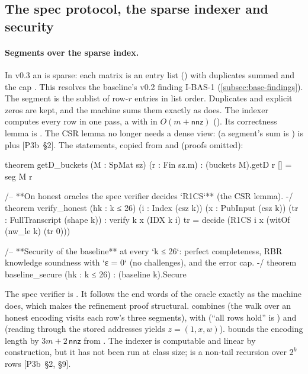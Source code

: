 \subsection{The spec protocol, the sparse indexer and security}\label{subsec:base-spec}

\paragraph{Segments over the sparse index.} In v0.3 an  is sparse: each matrix is an entry
list () with duplicates summed and the cap . This resolves the
baseline's v0.2 finding I-BAS-1 (\cref{subsec:base-findings}). The segment  is the sublist of
row-$r$ entries in list order. Duplicates and explicit zeros are kept, and the machine sums them
exactly as  does. The indexer computes every row in one pass, a  with
 in $O(m+\mathsf{nnz})$ (). Its correctness lemma is
. The CSR lemma no longer needs a dense view:  (a segment's sum is
) is  plus  [P3b~§2]. The statements,
copied from  and  (proofs omitted):

\begin{leancode}
theorem getD_buckets (M : SpMat sz) (r : Fin sz.m) : (buckets M).getD r [] = seg M r

/-- **On honest oracles the spec verifier decides `R1CS`** (the CSR lemma). -/
theorem verify_honest (hk : k ≤ 26) (i : Index (csz k)) (x : PubInput (csz k))
    (tr : FullTranscript (shape k)) :
    verify k x (IDX k i) tr = decide (R1CS i x (witOf (nw_le k) (tr 0)))

/-- **Security of the baseline** at every `k ≤ 26`: perfect completeness, RBR knowledge
soundness with `ε = 0` (no challenges), and the error cap. -/
theorem baseline_secure (hk : k ≤ 26) : (baseline k).Secure
\end{leancode}

The spec verifier  is . It follows the end words of the oracle exactly as
the machine does, which makes the refinement proof structural.  combines
 (the walk over an honest encoding visits each row's three segments),
 with  (``all rows hold'' is ) and 
(reading through the stored addresses yields $z=(1,x,w)$).  bounds the encoding
length by $3m+2\,\mathsf{nnz}$ from . The indexer is computable and linear by
construction, but it has not been run at class size;  is a non-tail recursion over
$2^k$ rows [P3b~§2, §9].

